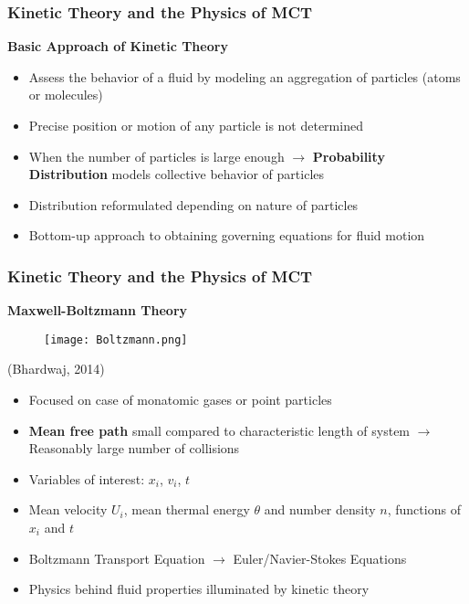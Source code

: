 \documentclass{beamer}
\begin{document}
\begin{frame}
\frametitle{Kinetic Theory and the Physics of MCT}
\large
\textbf{Basic Approach of Kinetic Theory}
\begin{itemize}
\item Assess the behavior of a fluid by modeling an aggregation of particles 
(atoms or molecules)
\item Precise position or motion of any particle is not determined
\item When the number of particles is large enough $\rightarrow$ 
\textbf{Probability Distribution} models collective behavior of particles
\item Distribution reformulated depending on nature of particles
\item Bottom-up approach to obtaining governing equations for fluid motion 
\end{itemize}
\pause
\end{frame}

\begin{frame}

\frametitle{Kinetic Theory and the Physics of MCT}

\textbf{\large Maxwell-Boltzmann Theory}
\begin{multicols}{2}

\begin{figure}
 \texttt{[image: Boltzmann.png]}
\end{figure}
\small
\centering
(Bhardwaj, 2014) 
\begin{itemize}
 \item Focused on case of monatomic gases or point particles
 \item \textbf{Mean free path} small compared to characteristic length of 
system 
$\rightarrow$ Reasonably large number of collisions
 \item Variables of interest: $x_{i}$, $v_{i}$, $t$
 \item Mean velocity $U_{i}$, mean thermal energy $\theta$ and number density 
$n$, functions of $x_{i}$ and $t$
\item Boltzmann Transport Equation \pause $\rightarrow$ 
Euler/Navier-Stokes Equations
\pause
\item Physics behind fluid properties illuminated by kinetic theory
\end{itemize}
\end{multicols}
\Large
\end{frame}
\end{document}
